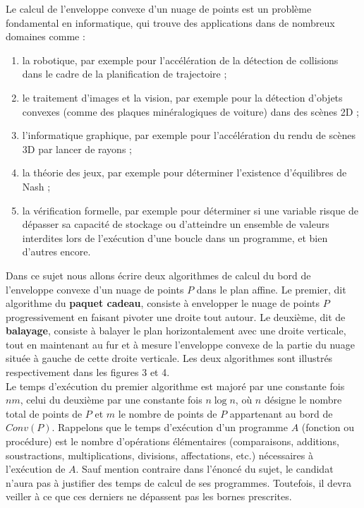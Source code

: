 \documentclass[a4paper,french,bookmarks]{article}
\begin{document}
Le calcul de l’enveloppe convexe d’un nuage de points est un problème fondamental en informatique, qui trouve des applications dans de nombreux domaines comme :
\begin{enumerate}
    \item[\bullet] la robotique, par exemple pour l’accélération de la détection de collisions dans le cadre de la planification de trajectoire ;
    \item[\bullet] le traitement d’images et la vision, par exemple pour la détection d’objets convexes (comme des plaques minéralogiques de voiture) dans des scènes 2D ;
    \item[\bullet] l’informatique graphique, par exemple pour l’accélération du rendu de scènes 3D par lancer de rayons ;
    \item[\bullet] la théorie des jeux, par exemple pour déterminer l’existence d’équilibres de Nash ;
    \item[\bullet] la vérification formelle, par exemple pour déterminer si une variable risque de dépasser sa capacité de stockage ou d’atteindre un ensemble de valeurs interdites lors de l’exécution d’une boucle dans un programme, et bien d’autres encore.
\end{enumerate}
Dans ce sujet nous allons écrire deux algorithmes de calcul du bord de l’enveloppe convexe d’un nuage de points $P$ dans le plan affine. Le premier, dit algorithme du \textbf{paquet cadeau}, consiste à envelopper le nuage de points $P$ progressivement en faisant pivoter une droite tout autour. Le deuxième, dit de \textbf{balayage}, consiste à balayer le plan horizontalement avec une droite verticale, tout en maintenant au fur et à mesure l’enveloppe convexe de la partie du nuage située à gauche de cette droite verticale. Les deux algorithmes sont illustrés respectivement dans les figures 3 et 4.\\

Le temps d’exécution du premier algorithme est majoré par une constante fois $nm$, celui du deuxième par une constante fois $n \log n$, où $n$ désigne le nombre total de points de $P$ et $m$ le nombre de points de $P$ appartenant au bord de $Conv(P)$.
Rappelons que le temps d’exécution d’un programme $A$ (fonction ou procédure) est le nombre d’opérations élémentaires (comparaisons, additions, soustractions, multiplications, divisions, affectations, etc.) nécessaires à l’exécution de $A$. Sauf mention contraire dans l’énoncé du
sujet, le candidat n’aura pas à justifier des temps de calcul de ses programmes. Toutefois, il devra veiller à ce que ces derniers ne dépassent pas les bornes prescrites.\\
\end{document}
